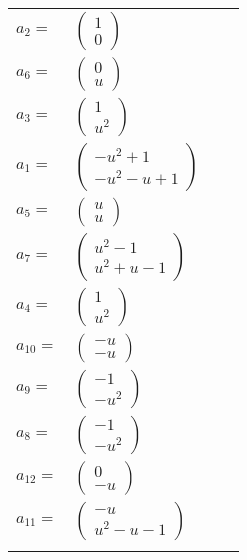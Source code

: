 \documentclass[1p]{elsarticle_modified}
\theoremstyle{definition}
\begin{document}
\begin{tabular}{m{7pt} m{180pt} m{7pt} m{180pt} }
\flushright $a_{2}=$&$\begin{pmatrix}1\\0\end{pmatrix}$ \\
\flushright $a_{6}=$&$\begin{pmatrix}0\\u\end{pmatrix}$ \\
\flushright $a_{3}=$&$\begin{pmatrix}1\\u^2\end{pmatrix}$ \\
\flushright $a_{1}=$&$\begin{pmatrix}- u^2+1\\- u^2- u+1\end{pmatrix}$ \\
\flushright $a_{5}=$&$\begin{pmatrix}u\\u\end{pmatrix}$ \\
\flushright $a_{7}=$&$\begin{pmatrix}u^2-1\\u^2+u-1\end{pmatrix}$ \\
\flushright $a_{4}=$&$\begin{pmatrix}1\\u^2\end{pmatrix}$ \\
\flushright $a_{10}=$&$\begin{pmatrix}- u\\- u\end{pmatrix}$ \\
\flushright $a_{9}=$&$\begin{pmatrix}-1\\- u^2\end{pmatrix}$ \\
\flushright $a_{8}=$&$\begin{pmatrix}-1\\- u^2\end{pmatrix}$ \\
\flushright $a_{12}=$&$\begin{pmatrix}0\\- u\end{pmatrix}$ \\
\flushright $a_{11}=$&$\begin{pmatrix}- u\\u^2- u-1\end{pmatrix}$\\&\end{tabular}
\end{document}
